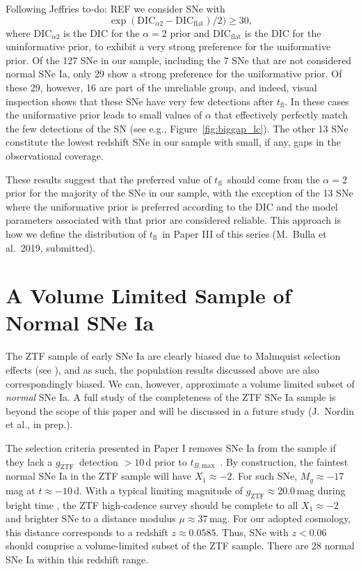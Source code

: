 \documentclass[twocolumn]{./aastex63}
\newcommand{\todo}[1]{{\color{magenta} to-do: {#1}}}
\newcommand{\gztf}{$g_\mathrm{ZTF}$}
\newcommand{\tfl}{$t_\mathrm{fl}$}
\newcommand{\tbmax}{$t_{B,\mathrm{max}}$}
\begin{document}
Following Jeffries \todo{REF} we consider SNe with
%
$$\exp(\mathrm{DIC}_{\alpha2} - \mathrm{DIC}_\mathrm{flat})/2) \ge 30,$$
%
where $\mathrm{DIC}_{\alpha2}$ is the DIC for the $\alpha = 2$ prior and
$\mathrm{DIC}_\mathrm{flat}$ is the DIC for the uninformative prior, to
exhibit a very strong preference for the uniformative prior. Of the 127 SNe in
our sample, including the 7 SNe that are not considered normal SNe Ia, only 29
show a strong preference for the uniformative prior. Of these 29, however, 16
are part of the unreliable group, and indeed, visual inspection shows that
these SNe have very few detections after \tfl. In these cases the uniformative
prior leads to small values of $\alpha$ that effectively perfectly match the
few detections of the SN (see e.g., Figure~\ref{fig:biggap_lc}). The other 13
SNe constitute the lowest redshift SNe in our sample with small, if any, gaps
in the observational coverage.

These results suggest that the preferred value of \tfl\ should come from the
$\alpha = 2$ prior for the majority of the SNe in our sample, with the
exception of the 13 SNe where the uniformative prior is preferred according to
the DIC and the model parameters associated with that prior are considered
reliable. This approach is how we define the distribution of \tfl\ in Paper
III of this series (M.~Bulla et al.~2019, submitted).

\section{A Volume Limited Sample of Normal SNe Ia}

The ZTF sample of early SNe Ia are clearly biased due to Malmquist selection
effects (see \citealt{Yao19}), and as such, the population results discussed
above are also correspondingly biased. We can, however, approximate a volume
limited subset of \textit{normal} SNe Ia. A full study of the completeness of
the ZTF SNe Ia sample is beyond the scope of this paper and will be discussed
in a future study (J.~Nordin et al., in prep.).

The selection criteria presented in Paper I removes SNe Ia from the sample if
they lack a \gztf\ detection $> 10$\,d prior to \tbmax\ \citep{Yao19}. By
construction, the faintest normal SNe Ia in the ZTF sample will have $X_1
\approx -2$. For such SNe, $M_g \approx -17$\,mag at $t \approx -10$\,d. With a
typical limiting magnitude of \gztf$ \approx 20.0$\,mag during bright time
\citep{Bellm19}, the ZTF high-cadence survey should be complete to all $X_1
\approx -2$ and brighter SNe to a distance modulus $\mu \approx 37$\,mag. For
our adopted cosmology, this distance corresponds to a redshift $z \approx
0.0585$. Thus, SNe with $z < 0.06$ should comprise a volume-limited subset of
the ZTF sample. There are 28 normal SNe Ia within this redshift range.
\end{document}
